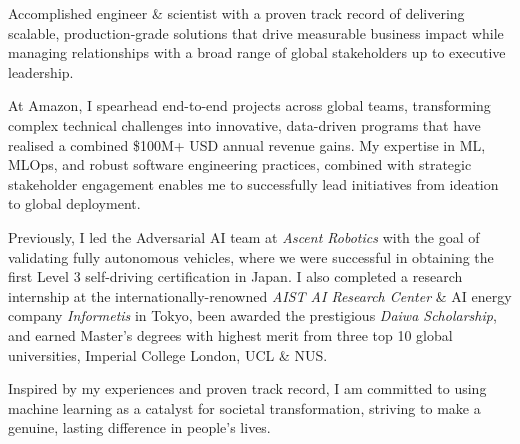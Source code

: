 

\begin{cvparagraph}

Accomplished engineer \& scientist with a proven track record of delivering scalable, production-grade solutions that drive measurable business impact while managing relationships with a broad range of global stakeholders up to executive leadership.

At Amazon, I spearhead end-to-end projects across global teams, transforming complex technical challenges into innovative, data-driven programs that have realised a combined \$100M+ USD annual revenue gains. My expertise in ML, MLOps, and robust software engineering practices, combined with strategic stakeholder engagement enables me to successfully lead initiatives from ideation to global deployment.

Previously, I led the Adversarial AI team at \emph{Ascent Robotics} with the goal of validating fully autonomous vehicles, where we were successful in obtaining the first Level 3 self-driving certification in Japan. I also completed a research internship at the internationally-renowned \emph{AIST AI Research Center} \& AI energy company \emph{Informetis} in Tokyo, been awarded the prestigious \emph{Daiwa Scholarship}, and earned Master's degrees with highest merit from three top 10 global universities, Imperial College London, UCL \& NUS. 

Inspired by my experiences and proven track record, I am committed to using machine learning as a catalyst for societal transformation, striving to make a genuine, lasting difference in people's lives.



\end{cvparagraph}